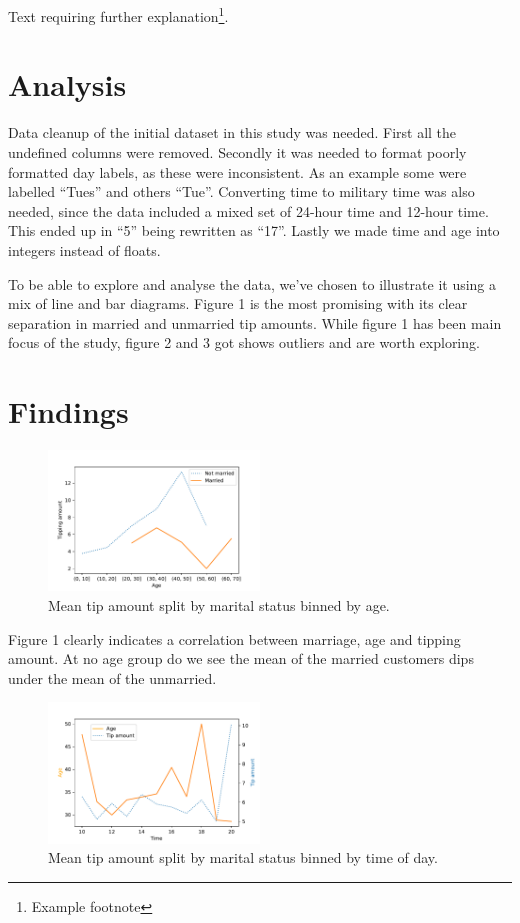 \documentclass[twoside,twocolumn]{article}
\begin{document}
Text requiring further explanation\footnote{Example footnote}.


\section{Analysis}Data cleanup of the initial dataset in this study was needed. First all the undefined columns were removed. Secondly it was needed to format poorly formatted day labels, as these were inconsistent. As an example some were labelled “Tues” and others “Tue”. Converting time to military time was also needed, since the data included a mixed set of 24-hour time and 12-hour time. This ended up in “5” being rewritten as “17”. Lastly we made time and age into integers instead of floats.

To be able to explore and analyse the data, we've chosen to illustrate it using a mix of line and bar diagrams. Figure 1 is the most promising with its clear separation in married and unmarried tip amounts. While figure 1 has been main focus of the study, figure 2 and 3 got shows outliers and are worth exploring.



\section{Findings}

\begin{figure}[h]
  \centering
  \includegraphics[width=0.5\textwidth]{figures/tip_amount_by_age.pdf}
  \caption{Mean tip amount split by marital status binned by age.}
  \label{fig:tip-amount-by-age}
\end{figure}

Figure 1 clearly indicates a correlation between marriage, age and tipping amount. At no age group do we see the mean of the married customers dips under the mean of the unmarried.

\begin{figure}[h]
  \centering
  \includegraphics[width=0.5\textwidth]{figures/time_of_day_and_age.pdf}
  \caption{Mean tip amount split by marital status binned by time of day.}
  \label{fig:time-of-day-and-age}
\end{figure}
\end{document}
